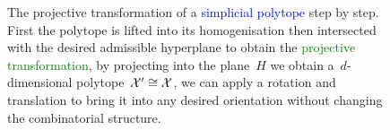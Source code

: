 \begin{figure}
\begin{tikzpicture}
\end{tikzpicture}
\caption[The projective transformation of a polytope]{The projective transformation of a \textcolor{blue}{simplicial polytope} step by step.
First the polytope is lifted into its homogenisation then intersected with the desired admissible hyperplane to obtain the \textcolor{green}{projective transformation}, by projecting into the plane~$H$ we obtain a~$d$-dimensional polytope~$\X^\prime\cong\X$, we can apply a rotation and translation to bring it into any desired orientation without changing the combinatorial structure.}
\label{fig:projective:transformation:explained}
\end{figure}
%
%
%
%
